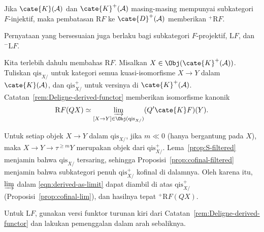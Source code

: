 \begin{lema}\label{prop:derived-functor-res}
	Jika $\cate{K}(\mathcal{A})$ dan $\cate{K}^+(\mathcal{A})$ masing-masing
	mempunyai subkategori $F$-injektif, maka pembatasan $\mathrm{R}F$ ke
	$\cate{D}^+(\mathcal{A})$ memberikan ${}^+\mathrm{R}F$.

	Pernyataan yang bersesuaian juga berlaku bagi subkategori $F$-projektif,
	$\mathrm{L}F$, dan ${}^-\mathrm{L}F$.
\end{lema}
\begin{bukti}
	Kita terlebih dahulu membahas $\mathrm{R}F$. Misalkan
	$X\in\Obj(\cate{K}^+(\mathcal{A}))$. Tuliskan $\mathrm{qis}_{X/}$ untuk
	kategori semua kuasi-isomorfisme $X\to Y$ dalam $\cate{K}(\mathcal{A})$,
dan $\mathrm{qis}^+_{X/}$ untuk versinya di $\cate{K}^+(\mathcal{A})$.
Catatan~\ref{rem:Deligne-derived-functor} memberikan isomorfisme kanonik
	\begin{equation}\label{eqn:derived-as-limit}\begin{aligned}
		\mathrm{R}F(QX) \simeq \varinjlim_{[X \to Y] \in \Obj(\mathrm{qis}_{X/})} (Q' \cate{K}F)(Y).
	\end{aligned}\end{equation}

	Untuk setiap objek $X\to Y$ dalam $\mathrm{qis}_{X/}$, jika $m\ll0$
	(hanya bergantung pada $X$), maka
	$X\to Y\to\tau^{\geq m}Y$ merupakan objek dari
	$\mathrm{qis}^+_{X/}$. Lema~\ref{prop:S-filtered} menjamin bahwa
	$\mathrm{qis}_{X/}$ tersaring, sehingga
	Proposisi~\ref{prop:cofinal-filtered} menjamin bahwa subkategori penuh
	$\mathrm{qis}^+_{X/}$ kofinal di dalamnya. Oleh karena itu, $\varinjlim$
dalam \eqref{eqn:derived-as-limit} dapat diambil di atas
$\mathrm{qis}^+_{X/}$ (Proposisi~\ref{prop:cofinal-lim}), dan hasilnya tepat
${}^+\mathrm{R}F(QX)$.

	Untuk $\mathrm{L}F$, gunakan versi funktor turunan kiri dari
	Catatan~\ref{rem:Deligne-derived-functor} dan lakukan pemenggalan dalam arah
	sebaliknya.
\end{bukti}


